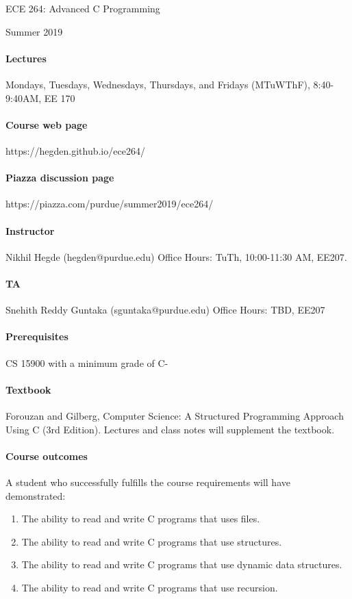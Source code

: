 \documentclass{article}
\begin{document}
\begin{center}{\LARGE ECE 264: Advanced C Programming} \end{center}
\begin{center}{\large Summer 2019} \end{center}

\bigskip

\paragraph{Lectures}
Mondays, Tuesdays, Wednesdays, Thursdays, and Fridays (MTuWThF), 8:40-9:40AM, EE 170
\paragraph{Course web page} https://hegden.github.io/ece264/
\paragraph{Piazza discussion page} https://piazza.com/purdue/summer2019/ece264/

\paragraph{Instructor}
Nikhil Hegde (hegden@purdue.edu)
Office Hours: TuTh, 10:00-11:30 AM, EE207.

\paragraph{TA}
Snehith Reddy Guntaka (sguntaka@purdue.edu)
Office Hours: TBD, EE207

\paragraph{Prerequisites} CS 15900 with a minimum grade of C-
\paragraph{Textbook} Forouzan and Gilberg, Computer Science: A Structured Programming Approach Using C (3rd Edition). Lectures and class notes will supplement the textbook.
\paragraph{Course outcomes} A student who successfully fulfills the course requirements will have demonstrated:
\begin{enumerate}
\item The ability to read and write C programs that uses files. 
\item The ability to read and write C programs that use structures. 
\item The ability to read and write C programs that use dynamic data structures.
\item The ability to read and write C programs that use recursion. 
\end{enumerate}
\end{document}
